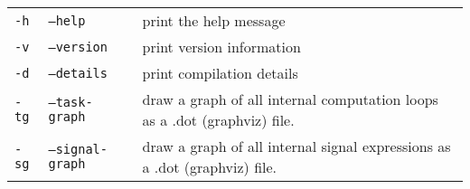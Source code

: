 \tablelasttail{
  \hline
}


\begin{supertabular}{|p{1.5cm}|p{4cm}|p{5cm}|}  
\texttt{-h} 				& \texttt{--help} 					& print the help message  \\
\texttt{-v} 				& \texttt{--version} 				& print version information  \\
\texttt{-d} 				& \texttt{--details} 				& print compilation details  \\
\texttt{-tg} 				& \texttt{--task-graph} 			& draw a graph of all internal computation loops as a .dot (graphviz) file. \\
\texttt{-sg} 				& \texttt{--signal-graph} 			& draw a graph of all internal signal expressions as a .dot (graphviz) file.  \\


\end{supertabular}
